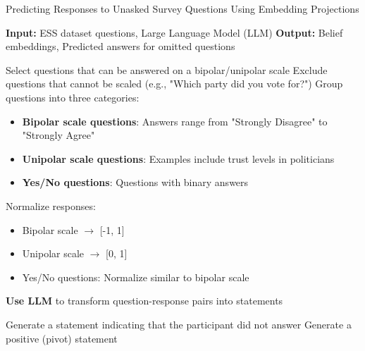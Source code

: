 \begin{algorithm}
\caption{Predicting Responses to Unasked Survey Questions Using Embedding Projections}
\begin{algorithmic}[1]
\State \textbf{Input:} ESS dataset questions, Large Language Model (LLM)
\State \textbf{Output:} Belief embeddings, Predicted answers for omitted questions

\State
{}
    \State Select questions that can be answered on a bipolar/unipolar scale
    \State Exclude questions that cannot be scaled (e.g., "Which party did you vote for?")
    \State Group questions into three categories:
    \begin{itemize}
        \item \textbf{Bipolar scale questions}: Answers range from "Strongly Disagree" to "Strongly Agree"
        \item \textbf{Unipolar scale questions}: Examples include trust levels in politicians
        \item \textbf{Yes/No questions}: Questions with binary answers
    \end{itemize}
    \State Normalize responses:
    \begin{itemize}
        \item Bipolar scale $\rightarrow$ [-1, 1]
        \item Unipolar scale $\rightarrow$ [0, 1]
        \item Yes/No questions: Normalize similar to bipolar scale
    \end{itemize}
\EndProcedure

\State

        \State \textbf{Use LLM} to transform question-response pairs into statements
        \State {}
        \State {}
        
            \State Generate a statement indicating that the participant did not answer
            \State {}
            \State {}
            \State Generate a positive (pivot) statement
            \State {}
            \State {}
        \EndIf
    \EndFor
\EndProcedure


\end{algorithmic}
\end{algorithm}
